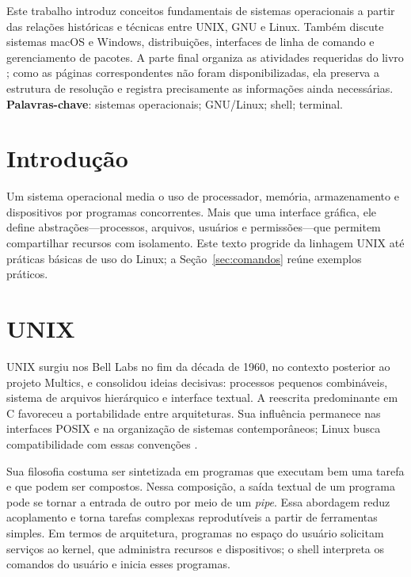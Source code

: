 \documentclass[12pt,openright,oneside,a4paper,brazil]{abntex2}
\begin{document}
\pretextual
\imprimircapa
\imprimirfolhaderosto{}
\begin{resumo}
Este trabalho introduz conceitos fundamentais de sistemas operacionais a partir das relações históricas e técnicas entre UNIX, GNU e Linux. Também discute sistemas macOS e Windows, distribuições, interfaces de linha de comando e gerenciamento de pacotes. A parte final organiza as atividades requeridas do livro ; como as páginas correspondentes não foram disponibilizadas, ela preserva a estrutura de resolução e registra precisamente as informações ainda necessárias.
\vspace{\onelineskip}
\noindent\textbf{Palavras-chave}: sistemas operacionais; GNU/Linux; shell; terminal.
\end{resumo}
\tableofcontents*
\textual

\chapter{Introdução}\label{chap:introducao}
Um sistema operacional media o uso de processador, memória, armazenamento e dispositivos por programas concorrentes. Mais que uma interface gráfica, ele define abstrações---processos, arquivos, usuários e permissões---que permitem compartilhar recursos com isolamento. Este texto progride da linhagem UNIX até práticas básicas de uso do Linux; a Seção~\ref{sec:comandos} reúne exemplos práticos.

\chapter{UNIX}\label{chap:unix}
UNIX surgiu nos Bell Labs no fim da década de 1960, no contexto posterior ao projeto Multics, e consolidou ideias decisivas: processos pequenos combináveis, sistema de arquivos hierárquico e interface textual. A reescrita predominante em C favoreceu a portabilidade entre arquiteturas. Sua influência permanece nas interfaces POSIX e na organização de sistemas contemporâneos; Linux busca compatibilidade com essas convenções \cite{kernelabout}.

Sua filosofia costuma ser sintetizada em programas que executam bem uma tarefa e que podem ser compostos. Nessa composição, a saída textual de um programa pode se tornar a entrada de outro por meio de um \textit{pipe}. Essa abordagem reduz acoplamento e torna tarefas complexas reprodutíveis a partir de ferramentas simples. Em termos de arquitetura, programas no espaço do usuário solicitam serviços ao kernel, que administra recursos e dispositivos; o shell interpreta os comandos do usuário e inicia esses programas.
\end{document}

